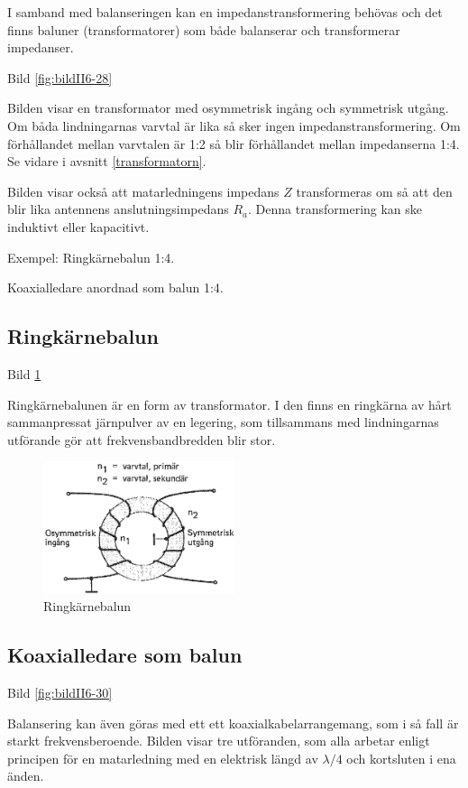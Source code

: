 I samband med balanseringen kan en impedanstransformering behövas och
det finns baluner (transformatorer) som både balanserar och
transformerar impedanser.

Bild \ref{fig:bildII6-28}

Bilden visar en transformator med osymmetrisk ingång och symmetrisk
utgång. Om båda lindningarnas varvtal är lika så sker ingen
impedanstransformering. Om förhållandet mellan varvtalen är 1:2 så
blir förhållandet mellan impedanserna 1:4. Se vidare i avsnitt \ref{transformatorn}.

Bilden visar också att matarledningens impedans \(Z\) transformeras om så
att den blir lika antennens anslutningsimpedans \(R_a\).  Denna
transformering kan ske induktivt eller kapacitivt.

Exempel:
Ringkärnebalun 1:4.

Koaxialledare anordnad som balun 1:4.

\subsection{Ringkärnebalun}

Bild \ref{fig:bildII6-29}

Ringkärnebalunen är en form av transformator. I den finns en ringkärna
av hårt sammanpressat järnpulver av en legering, som tillsammans med
lindningarnas utförande gör att frekvensbandbredden blir stor.

\begin{figure}
  \includegraphics[width=0.5\textwidth]{images/cropped_pdfs/bild_2_6-29.pdf}
  \caption{Ringkärnebalun}
  \label{fig:bildII6-29}
\end{figure}

\subsection{Koaxialledare som balun}

Bild \ref{fig:bildII6-30}

Balansering kan även göras med ett ett koaxialkabelarrangemang, som i
så fall är starkt frekvensberoende. Bilden visar tre utföranden, som
alla arbetar enligt principen för en matarledning med en elektrisk
längd av \(\lambda/4\) och kortsluten i ena änden.

